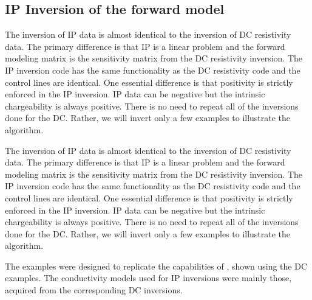 \subsection{IP Inversion of the forward model}
The inversion of IP data is almost identical to the inversion of DC resistivity data. The primary difference is that IP is a linear problem and the forward modeling matrix is the sensitivity matrix from the DC resistivity inversion. The IP inversion code has the same functionality as the DC resistivity code and the control lines are identical. One essential difference is that positivity is strictly enforced in the IP inversion. IP data can be negative but the intrinsic chargeability is always positive. There is no need to repeat all of the inversions done for the DC. Rather, we will invert only a few examples to illustrate the algorithm.
	
The inversion of IP data is almost identical to the inversion of DC resistivity data. The primary difference is that IP is a linear problem and the forward modeling matrix is the sensitivity matrix from the DC resistivity inversion. The IP inversion code has the same functionality as the DC resistivity code and the control lines are identical. One essential difference is that positivity is strictly enforced in the IP inversion. IP data can be negative but the intrinsic chargeability is always positive. There is no need to repeat all of the inversions done for the DC. Rather, we will invert only a few examples to illustrate the algorithm. 

The examples were designed to replicate the capabilities of \prog, shown using the DC examples. The conductivity models used for IP inversions were mainly those, acquired from the corresponding DC inversions.

